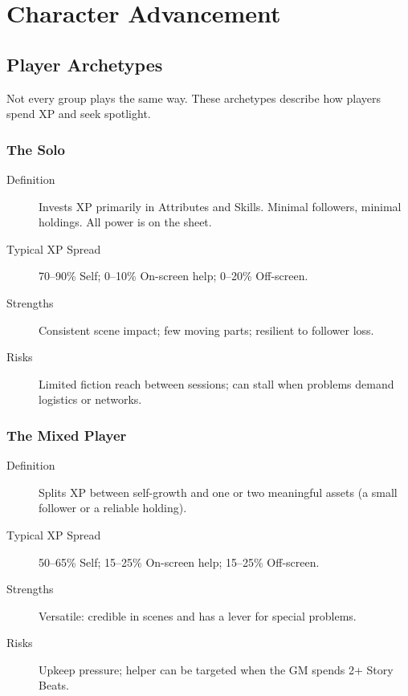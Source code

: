 \chapter{Character Advancement}

\section{Player Archetypes}

Not every group plays the same way. These archetypes describe how players spend XP and seek spotlight.

\subsection{The Solo}

\begin{description}
\item[Definition] Invests XP primarily in Attributes and Skills. Minimal followers, minimal holdings. All power is on the sheet.
\item[Typical XP Spread] 70--90\% Self; 0--10\% On-screen help; 0--20\% Off-screen.
\item[Strengths] Consistent scene impact; few moving parts; resilient to follower loss.
\item[Risks] Limited fiction reach between sessions; can stall when problems demand logistics or networks.
\end{description}

\subsection{The Mixed Player}

\begin{description}
\item[Definition] Splits XP between self-growth and one or two meaningful assets (a small follower or a reliable holding).
\item[Typical XP Spread] 50--65\% Self; 15--25\% On-screen help; 15--25\% Off-screen.
\item[Strengths] Versatile: credible in scenes and has a lever for special problems.
\item[Risks] Upkeep pressure; helper can be targeted when the GM spends 2+ Story Beats.
\end{description}

